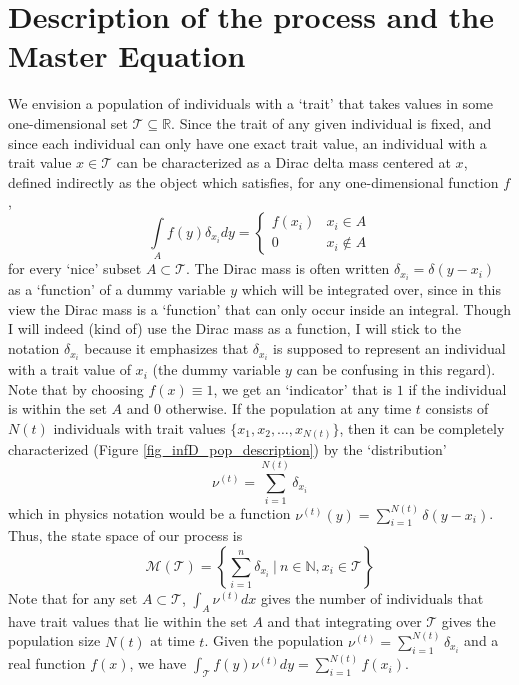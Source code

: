\section{Description of the process and the Master Equation}
We envision a population of individuals with a `trait' that takes values in some one-dimensional set $\mathcal{T} \subseteq \mathbb{R}$. Since the trait of any given individual is fixed, and since each individual can only have one exact trait value, an individual with a trait value $x \in \mathcal{T}$ can be characterized as a Dirac delta mass centered at $x$, defined indirectly as the object which satisfies, for any one-dimensional function $f$,
\begin{equation*}
    \int\limits_{A}f(y)\delta_{x_i}dy = 
    \begin{cases}
        f(x_i) & x_i \in A\\
        0 &  x_i \notin A 
    \end{cases}
\end{equation*}
for every `nice' subset $A \subset \mathcal{T}$. The Dirac mass is often written $\delta_{x_i} = \delta(y-x_i)$ as a `function' of a dummy variable $y$ which will be integrated over, since in this view the Dirac mass is a `function' that can only occur inside an integral. Though I will indeed (kind of) use the Dirac mass as a function, I will stick to the notation $\delta_{x_i}$ because it emphasizes that $\delta_{x_i}$ is supposed to represent an individual with a trait value of $x_i$ (the dummy variable $y$ can be confusing in this regard). Note that by choosing $f(x) \equiv 1$, we get an `indicator' that is $1$ if the individual is within the set $A$ and $0$ otherwise. If the population at any time $t$ consists of $N(t)$ individuals with trait values $\{x_1,x_2,\ldots,x_{N(t)}\}$, then it can be completely characterized (Figure \ref{fig_infD_pop_description}) by the `distribution'
\begin{equation*}
    \nu^{(t)} = \sum\limits_{i=1}^{N(t)}\delta_{x_i}
\end{equation*}
which in physics notation would be a function $\nu^{(t)}(y) = \sum_{i=1}^{N(t)} \delta(y-x_i)$. Thus, the state space of our process is
\begin{equation*}
    \mathcal{M}(\mathcal{T})= \left\{\sum\limits_{i=1}^{n}\delta_{x_i} \ | \ n \in \mathbb{N}, x_i \in \mathcal{T}\right\}
\end{equation*}
Note that for any set $A \subset \mathcal{T}$, $\int_A\nu^{(t)}dx$ gives the number of individuals that have trait values that lie within the set $A$ and that integrating over $\mathcal{T}$ gives the population size $N(t)$ at time $t$. Given the population $\nu^{(t)} = \sum_{i=1}^{N(t)}\delta_{x_i}$ and a real function $f(x)$, we have $\int_{\mathcal{T}}f(y)\nu^{(t)}dy = \sum_{i=1}^{N(t)}f(x_i)$.
